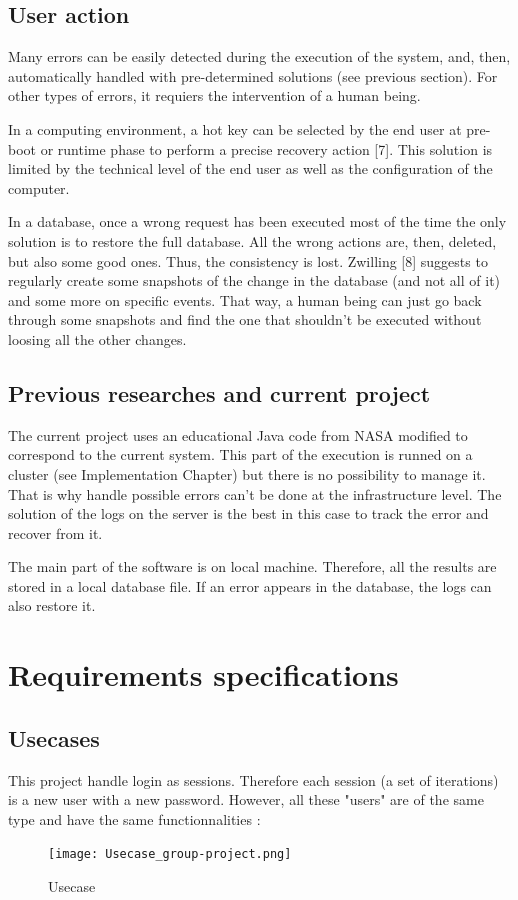\documentclass[10pt,a4paper]{report}
\begin{document}
	\section{User action}	
Many errors can be easily detected during the execution of the system, and, then, automatically handled with pre-determined solutions (see previous section). For other types of errors, it requiers the intervention of a human being. 

In a computing environment, a hot key can be selected by the end user at pre-boot or runtime phase to perform a precise recovery action [7]. This solution is limited by the technical level of the end user as well as the configuration of the computer. 

In a database, once a wrong request has been executed most of the time the only solution is to restore the full database. All the wrong actions are, then, deleted, but also some good ones. Thus, the consistency is lost. Zwilling [8] suggests to regularly create some snapshots of the change in the database (and not all of it) and some more on specific events. That way, a human being can just go back through some snapshots and find the one that shouldn't be executed without loosing all the other changes.

	\section{Previous researches and current project}
The current project uses an educational Java code from NASA modified to correspond to the current system. This part of the execution is runned on a cluster (see Implementation Chapter) but there is no possibility to manage it. That is why handle possible errors can't be done at the infrastructure level. The solution of the logs on the server is the best in this case to track the error and recover from it. 

The main part of the software is on local machine. Therefore, all the results are stored in a local database file. If an error appears in the database, the logs can also restore it.



\chapter{Requirements specifications}
	\section{Usecases}
This project handle login as sessions. Therefore each session (a set of iterations) is a new user with a new password.  However, all these "users" are of the same type and have the same functionnalities : \\
\begin{figure}[h!]
\texttt{[image: Usecase\_group-project.png]}\\
\caption{Usecase}
\end{figure}
\end{document}
